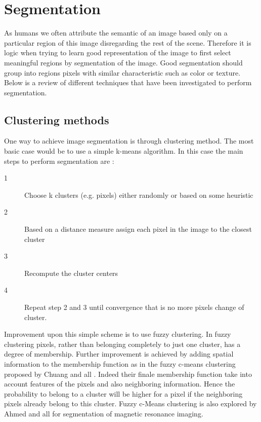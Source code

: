 \chapter{Segmentation}

  As humans we often attribute the semantic of an image based only on a particular region of this image disregarding the rest of the scene. Therefore it is logic when trying to learn good representation of the image to first select meaningful regions by segmentation of the image. Good segmentation should group into regions pixels with similar characteristic such as color or texture. Below is a review of different techniques that have been investigated to perform segmentation.

  \section{Clustering methods}

  One way to achieve image segmentation is through clustering method. The most basic case would be to use a simple k-means algorithm. In this case the main steps to perform segmentation are :

  \begin{description}
    \item[1] Choose k clusters (e.g. pixels) either randomly or based on some heuristic
    \item[2] Based on a distance measure assign each pixel in the image to the closest cluster
    \item[3] Recompute the cluster centers
    \item[4] Repeat step 2 and 3 until convergence that is no more pixels change of cluster.
  \end{description}

  Improvement upon this simple scheme is to use fuzzy clustering. In fuzzy clustering pixels, rather than belonging completely to just one cluster, has a degree of membership. Further improvement is achieved by adding spatial information to the membership function as in the fuzzy c-means clustering proposed by Chuang and all \cite{chuang2006fuzzy}. Indeed their finale membership function take into account features of the pixels and also neighboring information. Hence the probability to belong to a cluster will be higher for a pixel if the neighboring pixels already belong to this cluster. Fuzzy c-Means clustering is also explored by Ahmed and all \cite{ahmed2002modified} for segmentation of magnetic resonance imaging.

